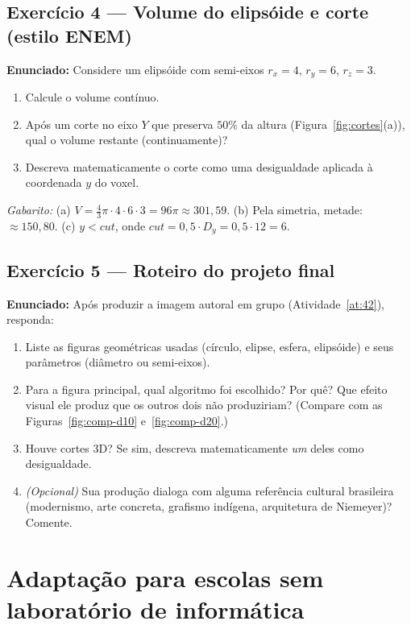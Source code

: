 \documentclass[12pt,a4paper]{scrartcl}
\begin{document}
\subsection*{Exercício 4 --- Volume do elipsóide e corte (estilo ENEM)}
\textbf{Enunciado:} Considere um elipsóide com semi-eixos $r_x = 4$, $r_y = 6$, $r_z = 3$.
\begin{enumerate}[label=\alph*),leftmargin=1.5em,itemsep=0.1em,topsep=0.2em,nosep]
  \item Calcule o volume contínuo.
  \item Após um corte no eixo $Y$ que preserva $50\%$ da altura (Figura~\ref{fig:cortes}(a)), qual o volume restante (continuamente)?
  \item Descreva matematicamente o corte como uma desigualdade aplicada à coordenada $y$ do voxel.
\end{enumerate}

\emph{Gabarito:}
(a) $V = \tfrac{4}{3}\pi \cdot 4 \cdot 6 \cdot 3 = 96\pi \approx 301{,}59$.
(b) Pela simetria, metade: $\approx 150{,}80$.
(c) $y < \mathit{cut}$, onde $\mathit{cut} = 0{,}5 \cdot D_y = 0{,}5 \cdot 12 = 6$.

\subsection*{Exercício 5 --- Roteiro do projeto final}
\textbf{Enunciado:} Após produzir a imagem autoral em grupo (Atividade~\ref{at:42}), responda:
\begin{enumerate}[label=(\arabic*),leftmargin=1.7em,itemsep=0.15em,topsep=0.2em,nosep]
  \item Liste as figuras geométricas usadas (círculo, elipse, esfera, elipsóide) e seus parâmetros (diâmetro ou semi-eixos).
  \item Para a figura principal, qual algoritmo foi escolhido? Por quê? Que efeito visual ele produz que os outros dois não produziriam? (Compare com as Figuras~\ref{fig:comp-d10} e~\ref{fig:comp-d20}.)
  \item Houve cortes 3D? Se sim, descreva matematicamente \emph{um} deles como desigualdade.
  \item \emph{(Opcional)} Sua produção dialoga com alguma referência cultural brasileira (modernismo, arte concreta, grafismo indígena, arquitetura de Niemeyer)? Comente.
\end{enumerate}

\newpage
\section{Adaptação para escolas sem laboratório de informática}\label{ap:adapt-analog}
\end{document}

